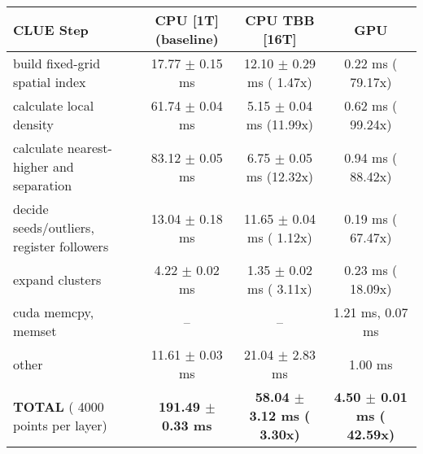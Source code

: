     \begin{tabular}{l|c|c|c}
    \hline
    CLUE Step                                 & CPU [1T] (baseline)         & CPU TBB [16T]                         & GPU                       \\ \hline
    build fixed-grid spatial index            &  17.77 $\pm$  0.15 ms       &  12.10 $\pm$  0.29 ms ( 1.47x)        &   0.22 ms ( 79.17x)       \\
    calculate local density                   &  61.74 $\pm$  0.04 ms       &   5.15 $\pm$  0.04 ms (11.99x)        &   0.62 ms ( 99.24x)       \\
    calculate nearest-higher and separation   &  83.12 $\pm$  0.05 ms       &   6.75 $\pm$  0.05 ms (12.32x)        &   0.94 ms ( 88.42x)       \\
    decide seeds/outliers, register followers &  13.04 $\pm$  0.18 ms       &  11.65 $\pm$  0.04 ms ( 1.12x)        &   0.19 ms ( 67.47x)       \\
    expand clusters                           &   4.22 $\pm$  0.02 ms       &   1.35 $\pm$  0.02 ms ( 3.11x)        &   0.23 ms ( 18.09x)       \\ \hline
    cuda memcpy, memset                       & --                          & --                                    &   1.21 ms,   0.07 ms      \\ 
    other                                     &  11.61 $\pm$  0.03 ms       &  21.04 $\pm$  2.83 ms                 &   1.00 ms                 \\ \hline
    \textbf{TOTAL} ( 4000 points per layer)   & \textbf{191.49 $\pm$  0.33 ms} & \textbf{ 58.04 $\pm$  3.12 ms ( 3.30x)} & \textbf{  4.50 $\pm$  0.01 ms ( 42.59x)}  \\
    \hline 
    \end{tabular}
    \linebreak


